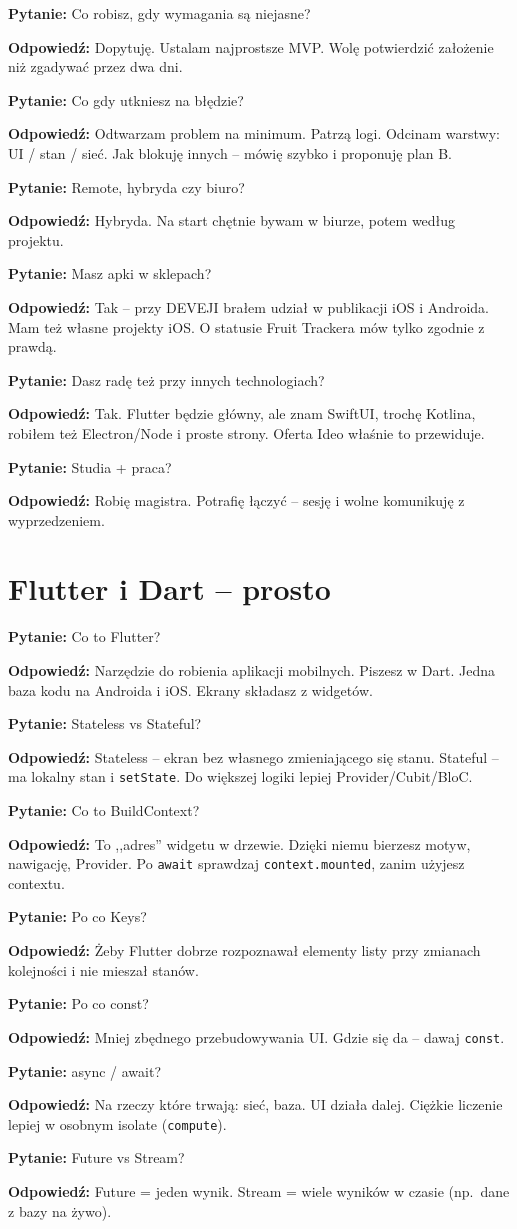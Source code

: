 \documentclass[11pt,a4paper]{article}
\newcommand{\pyt}[1]{\par\medskip\noindent\textbf{Pytanie:} #1\par}
\newcommand{\odp}[1]{\noindent\textbf{Odpowiedź:} #1\par}
\begin{document}
\pyt{Co robisz, gdy wymagania są niejasne?}
\odp{Dopytuję. Ustalam najprostsze MVP. Wolę potwierdzić założenie niż zgadywać przez dwa dni.}

\pyt{Co gdy utkniesz na błędzie?}
\odp{Odtwarzam problem na minimum. Patrzą logi. Odcinam warstwy: UI / stan / sieć. Jak blokuję innych -- mówię szybko i proponuję plan B.}

\pyt{Remote, hybryda czy biuro?}
\odp{Hybryda. Na start chętnie bywam w biurze, potem według projektu.}

\pyt{Masz apki w sklepach?}
\odp{Tak -- przy DEVEJI brałem udział w publikacji iOS i Androida. Mam też własne projekty iOS. O statusie Fruit Trackera mów tylko zgodnie z prawdą.}

\pyt{Dasz radę też przy innych technologiach?}
\odp{Tak. Flutter będzie główny, ale znam SwiftUI, trochę Kotlina, robiłem też Electron/Node i proste strony. Oferta Ideo właśnie to przewiduje.}

\pyt{Studia + praca?}
\odp{Robię magistra. Potrafię łączyć -- sesję i wolne komunikuję z wyprzedzeniem.}

\section{Flutter i Dart -- prosto}

\pyt{Co to Flutter?}
\odp{Narzędzie do robienia aplikacji mobilnych. Piszesz w Dart. Jedna baza kodu na Androida i iOS. Ekrany składasz z widgetów.}

\pyt{Stateless vs Stateful?}
\odp{Stateless -- ekran bez własnego zmieniającego się stanu. Stateful -- ma lokalny stan i \texttt{setState}. Do większej logiki lepiej Provider/Cubit/BloC.}

\pyt{Co to BuildContext?}
\odp{To ,,adres'' widgetu w drzewie. Dzięki niemu bierzesz motyw, nawigację, Provider. Po \texttt{await} sprawdzaj \texttt{context.mounted}, zanim użyjesz contextu.}

\pyt{Po co Keys?}
\odp{Żeby Flutter dobrze rozpoznawał elementy listy przy zmianach kolejności i nie mieszał stanów.}

\pyt{Po co const?}
\odp{Mniej zbędnego przebudowywania UI. Gdzie się da -- dawaj \texttt{const}.}

\pyt{async / await?}
\odp{Na rzeczy które trwają: sieć, baza. UI działa dalej. Ciężkie liczenie lepiej w osobnym isolate (\texttt{compute}).}

\pyt{Future vs Stream?}
\odp{Future = jeden wynik. Stream = wiele wyników w czasie (np.\ dane z bazy na żywo).}
\end{document}
